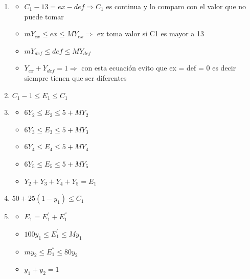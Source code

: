 \documentclass[12pt]{book}
\begin{document}
\begin{enumerate}[a]
\item 
	\begin{itemize}
	\item $ C_1 -13 = ex - def \Rightarrow C_1$ es continua y lo comparo con el valor que no puede tomar
	\item 	$ m Y_{ex} \leq ex \leq M Y_{ex} \Rightarrow$ 	ex toma valor si C1 es mayor a 13
	\item 	$ m Y_{def} \leq def \leq M Y_{def} $ 	
	\item $ Y_{ex} + Y_{def }= 1 \Rightarrow$ con esta ecuación evito que ex = def = 0 es decir siempre tienen que ser diferentes
	\end{itemize}
\item \quad $ C_1 -1  \leq E_1 \leq C_1  $ 
\item
	\begin{itemize}
	\item $  6Y_2 \leq  E_2  \leq 5 + M Y_2 $
	\item $  6Y_3 \leq  E_3  \leq 5 + M Y_3 $
	\item $  6Y_4 \leq  E_4  \leq 5 + M Y_4 $
	\item $  6Y_5 \leq  E_5  \leq 5 + M Y_5 $
	\item $ Y_2 + Y_3 + Y_4 + Y_5 = E_1$
	\end{itemize}
\item \quad $ 50 + 25(1-y_1)\leq C_1 $
\item 
	\begin{itemize}
	\item $ E_1 =  E_1^{'} +  E_1^{''}$
	\item $ 100 y_1 \leq E_1^{'} \leq M y_1 $
	\item $ m y_2 \leq E_1^{''} \leq 80 y_2$
	\item $ y_1 + y_2 = 1$
	\end{itemize}
\end{enumerate}
\end{document}
